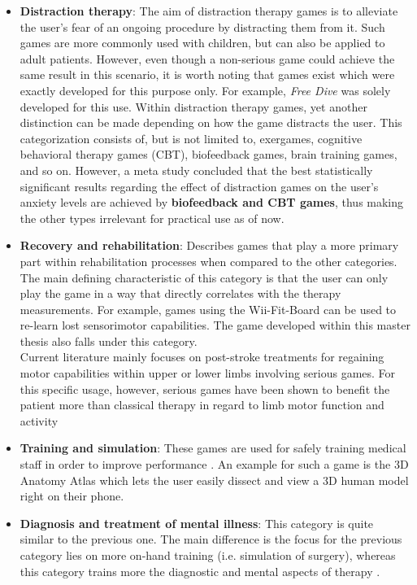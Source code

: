 \documentclass[draft,final]{vutinfth} %
\begin{document}
\begin{itemize}
\item \textbf{Distraction therapy}: The aim of distraction therapy games is to alleviate the user's fear of an ongoing procedure by distracting them from it. Such games are more commonly used with children, but can also be applied to adult patients. However, even though a non-serious game could achieve the same result in this scenario, it is worth noting that games exist which were exactly developed for this purpose only. For example, \emph{Free Dive} \cite{dahlquist2008effects} was solely developed for this use. Within distraction therapy games, yet another distinction can be made depending on how the game distracts the user. This categorization consists of, but is not limited to, exergames, cognitive behavioral therapy games (CBT), biofeedback games, brain training games, and so on. However, a meta study \cite{abd2022effectiveness} concluded that the best statistically significant results regarding the effect of distraction games on the user's anxiety levels are achieved by \textbf{biofeedback and CBT games}, thus making the other types irrelevant for practical use as of now.

\item \textbf{Recovery and rehabilitation}: Describes games that play a more primary part within rehabilitation processes when compared to the other categories. The main defining characteristic of this category is that the user can only play the game in a way that directly correlates with the therapy measurements. For example, games using the Wii-Fit-Board can be used to re-learn lost sensorimotor capabilities. The game developed within this master thesis also falls under this category. \\
Current literature mainly focuses on post-stroke treatments for regaining motor capabilities within upper or lower limbs involving serious games. For this specific usage, however, serious games have been shown to benefit the patient more than classical therapy in regard to limb motor function and activity \cite{doumas2021serious}

\item \textbf{Training and simulation}: These games are used for safely training medical staff in order to improve performance \cite{michael2005serious}. An example for such a game is the 3D Anatomy Atlas \cite{anatomy3D} which lets the user easily dissect and view a 3D human model right on their phone.

\item \textbf{Diagnosis and treatment of mental illness}: This category is quite similar to the previous one. The main difference is the focus for the previous category lies on more on-hand training (i.e. simulation of surgery), whereas this category trains more the diagnostic and mental aspects of therapy \cite{michael2005serious}.


\end{itemize}
\end{document}

